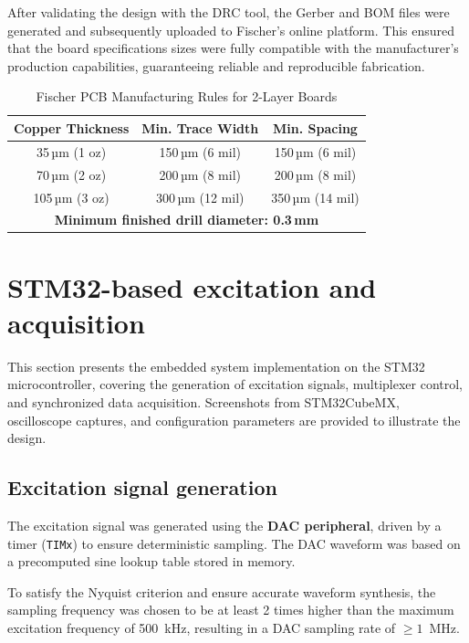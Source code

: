 After validating the design with the DRC tool, the Gerber and BOM files were generated and subsequently uploaded to Fischer’s online platform. This ensured that the board specifications sizes were fully compatible with the manufacturer’s production capabilities, guaranteeing reliable and reproducible fabrication.

\begin{table}[H]
\centering
\caption{Fischer PCB Manufacturing Rules for 2-Layer Boards\cite{FischerPCB}}
\begin{tabular}{|c|c|c|}
\hline
\textbf{Copper Thickness} & \textbf{Min. Trace Width} & \textbf{Min. Spacing} \\
\hline
35\,µm (1 oz)  & 150\,µm (6 mil)  & 150\,µm (6 mil) \\
\hline
70\,µm (2 oz)  & 200\,µm (8 mil)  & 200\,µm (8 mil) \\
\hline
105\,µm (3 oz) & 300\,µm (12 mil) & 350\,µm (14 mil) \\
\hline
\multicolumn{3}{|c|}{\textbf{Minimum finished drill diameter: 0.3\,mm}} \\
\hline
\end{tabular}
\end{table}
\section{STM32-based excitation and acquisition}

This section presents the embedded system implementation on the STM32 microcontroller, 
covering the generation of excitation signals, multiplexer control, and synchronized 
data acquisition. Screenshots from STM32CubeMX, oscilloscope captures, and configuration 
parameters are provided to illustrate the design.  

\subsection{Excitation signal generation}

The excitation signal was generated using the \textbf{DAC peripheral}, driven by a timer 
(\texttt{TIMx}) to ensure deterministic sampling. The DAC waveform was based on a 
precomputed sine lookup table stored in memory.  

To satisfy the Nyquist criterion and ensure accurate waveform synthesis, the sampling 
frequency was chosen to be at least 2 times higher than the maximum excitation frequency 
of 500~kHz, resulting in a DAC sampling rate of $\geq 1$~MHz.  

